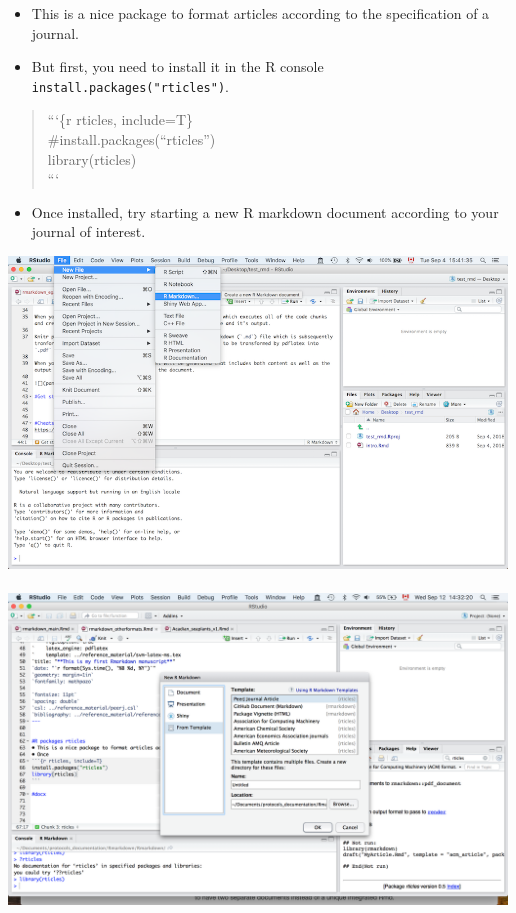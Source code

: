\documentclass[]{article}
\providecommand{\tightlist}{%
  \setlength{\itemsep}{0pt}\setlength{\parskip}{0pt}}
\begin{document}
\begin{itemize}
\item
  This is a nice package to format articles according to the
  specification of a journal.
\item
  But first, you need to install it in the R console
  \texttt{install.packages("rticles")}.
\end{itemize}

\begin{quote}
```\{r rticles, include=T\}\\
\#install.packages(``rticles'')\\
library(rticles)\\
```
\end{quote}

\begin{itemize}
\tightlist
\item
  Once installed, try starting a new R markdown document according to
  your journal of interest.
\end{itemize}

\includegraphics[width=5.20833in]{../figures/getstarted.png}\\
\hspace*{0.333em}\\
\includegraphics[width=5.20833in]{../figures/from_template.png}\\
\hspace*{0.333em}
\end{document}
